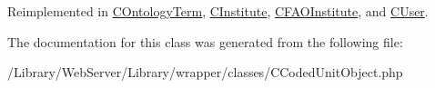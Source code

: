 Reimplemented in \hyperlink{class_c_ontology_term_a622c31b9466e49a1413d38fda9ef9bb1}{C\-Ontology\-Term}, \hyperlink{class_c_institute_a8f82ded3b52a6fb609c67e45669e1454}{C\-Institute}, \hyperlink{class_c_f_a_o_institute_a3bd7c59a3da53ba8c3cd1d9d0ff5ae0a}{C\-F\-A\-O\-Institute}, and \hyperlink{class_c_user_aed8557e18a89d868cedf5a48328b33b2}{C\-User}.



The documentation for this class was generated from the following file\-:\begin{DoxyCompactItemize}
\item 
/\-Library/\-Web\-Server/\-Library/wrapper/classes/C\-Coded\-Unit\-Object.\-php\end{DoxyCompactItemize}
